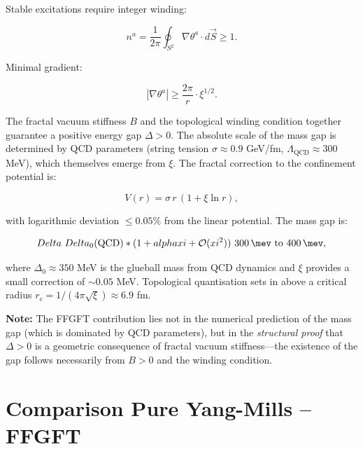 	Stable excitations require integer winding:
	
	\begin{equation}
		n^a = \frac{1}{2\pi} \oint_{S^2} \nabla \theta^a \cdot d\vec{S} \geq 1.
	\end{equation}
	
	Minimal gradient:
	
	\begin{equation}
		|\nabla \theta^a| \geq \frac{2\pi}{r} \cdot \xi^{1/2}.
	\end{equation}
	
	The fractal vacuum stiffness $B$ and the topological winding condition together guarantee a positive energy gap $\Delta > 0$. The absolute scale of the mass gap is determined by QCD parameters (string tension $\sigma \approx 0.9$ GeV/fm, $\Lambda_{\text{QCD}} \approx 300$ MeV), which themselves emerge from $\xi$. The fractal correction to the confinement potential is:
	
	\begin{equation}
		V(r) = \sigma \, r \, (1 + \xi \ln r),
	\end{equation}
	
	with logarithmic deviation $\leq 0.05\%$ from the linear potential. The mass gap is:
	
	\begin{equation}
		\Delta \approx \Delta_0(\text{QCD}) \cdot (1 + \alpha \xi + \mathcal{O}(\xi^2)) \approx \SIrange{300}{400}{\mev},
	\end{equation}
	
	where $\Delta_0 \approx 350$ MeV is the glueball mass from QCD dynamics and $\xi$ provides a small correction of $\sim 0.05$ MeV. Topological quantisation sets in above a critical radius $r_c = 1/(4\pi\sqrt{\xi}) \approx 6.9$ fm.
	
	\textbf{Note:} The FFGFT contribution lies not in the numerical prediction of the mass gap (which is dominated by QCD parameters), but in the \textit{structural proof} that $\Delta > 0$ is a geometric consequence of fractal vacuum stiffness---the existence of the gap follows necessarily from $B > 0$ and the winding condition.
	
	\section*{Comparison Pure Yang-Mills -- FFGFT}
	
	\begin{center}
		\small
	\end{center}
	
